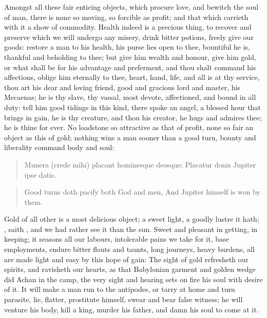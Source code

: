 {Amongst all these fair enticing objects, which procure love, and
bewitch the soul of man, there is none so moving, so forcible as
profit; and that which carrieth with it a show of commodity. Health
indeed is a precious thing, to recover and preserve which we will
undergo any misery, drink bitter potions, freely give our goods:
restore a man to his health, his purse lies open to thee, bountiful he
is, thankful and beholding to thee; but give him wealth and honour,
give him gold, or what shall be for his advantage and preferment, and
thou shalt command his affections, oblige him eternally to thee, heart,
hand, life, and all is at thy service, thou art his dear and loving
friend, good and gracious lord and master, his Mecaenas; he is thy
slave, thy vassal, most devote, affectioned, and bound in all duty:
tell him good tidings in this kind, there spoke an angel, a blessed
hour that brings in gain, he is thy creature, and thou his creator, he
hugs and admires thee; he is thine for ever. No loadstone so attractive
as that of profit, none so fair an object as this of gold;
nothing wins a man sooner than a good turn, bounty and liberality
command body and soul:

\begin{latin}
\begin{verse}%
Munera (crede mihi) placant hominesque deosque;
Placatur donis Jupiter ipse datis.
\end{verse}%
\end{latin}
\translationrule%
\begin{verse}%
Good turns doth pacify both God and men,
And Jupiter himself is won by them.
\end{verse}%

Gold of all other is a most delicious object; a sweet light, a goodly
lustre it hath; , saith \Austin{}, and we
had rather see it than the sun. Sweet and pleasant in getting, in
keeping; it seasons all our labours, intolerable pains we take for it,
base employments, endure bitter flouts and taunts, long journeys, heavy
burdens, all are made light and easy by this hope of gain:  The sight of gold
refresheth our spirits, and ravisheth our hearts, as that Babylonian
garment and  golden wedge did Achan in the camp, the very sight
and hearing sets on fire his soul with desire of it. It will make a man
run to the antipodes, or tarry at home and turn parasite, lie, flatter,
prostitute himself, swear and bear false witness; he will venture his
body, kill a king, murder his father, and damn his soul to come at it.

}
